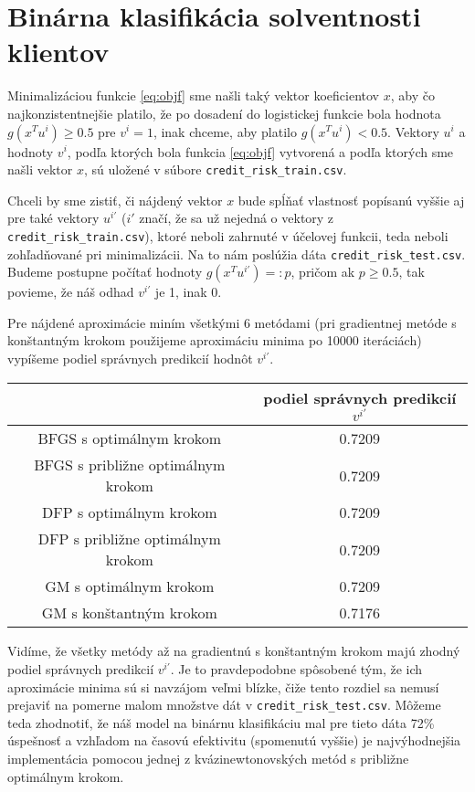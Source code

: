 \documentclass[report.tex]{subfiles}
\begin{document}
\section{Binárna klasifikácia solventnosti klientov}\label{sec:G}

Minimalizáciou funkcie \ref{eq:objf} sme našli taký vektor koeficientov $x$, aby čo najkonzistentnejšie platilo, že po dosadení do logistickej funkcie bola hodnota $g(x^Tu^i) \geq 0.5$ pre $v^i=1$, inak chceme, aby platilo $g(x^Tu^i) < 0.5$. Vektory $u^i$ a hodnoty $v^i$, podľa ktorých bola funkcia \ref{eq:objf} vytvorená a podľa ktorých sme našli vektor $x$, sú uložené v súbore \verb*|credit_risk_train.csv|.

Chceli by sme zistiť, či nájdený vektor $x$ bude spĺňať vlastnosť popísanú vyššie aj pre také vektory $u^{i'}$ ($i'$ značí, že sa už nejedná o vektory z \verb*|credit_risk_train.csv|), ktoré neboli zahrnuté v účelovej funkcii, teda neboli zohľadňované pri minimalizácii. Na to nám poslúžia dáta \verb*|credit_risk_test.csv|. Budeme postupne počítať hodnoty $g(x^Tu^{i'}) =: p$, pričom ak $p \geq 0.5$, tak povieme, že náš odhad $v^{i'}$ je 1, inak 0.

Pre nájdené aproximácie miním všetkými 6 metódami (pri gradientnej metóde s konštantným krokom použijeme aproximáciu minima po 10000 iteráciách) vypíšeme podiel správnych predikcií hodnôt $v^{i'}$.

\begin{center}
	\small
	\begin{tabular}{| c | c |}
		\hline
		& podiel správnych predikcií $v^{i'}$  \\
		\hline
		BFGS s optimálnym krokom & 0.7209  \\
		BFGS s približne optimálnym krokom & 0.7209  \\
		DFP s optimálnym krokom & 0.7209  \\
		DFP s približne optimálnym krokom & 0.7209  \\
		GM s optimálnym krokom & 0.7209  \\
		GM s konštantným krokom & 0.7176  \\
		\hline
	\end{tabular}
\end{center}

Vidíme, že všetky metódy až na gradientnú s konštantným krokom majú zhodný podiel správnych predikcií $v^{i'}$. Je to pravdepodobne spôsobené tým, že ich aproximácie minima sú si navzájom veľmi blízke, čiže tento rozdiel sa nemusí prejaviť na pomerne malom množstve dát v \verb*|credit_risk_test.csv|. Môžeme teda zhodnotiť, že náš model na binárnu klasifikáciu mal pre tieto dáta 72\% úspešnosť a vzhľadom na časovú efektivitu (spomenutú vyššie) je najvýhodnejšia implementácia pomocou jednej z kvázinewtonovských metód s približne optimálnym krokom.
\end{document}

